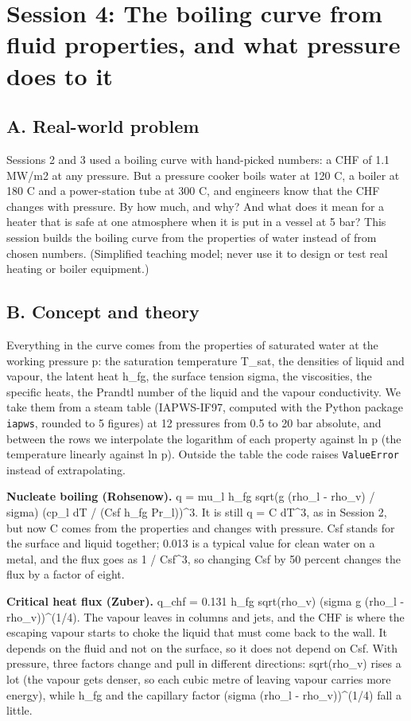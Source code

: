 \documentclass[11pt,a4paper]{article}
\begin{document}
\section{Session 4: The boiling curve from fluid properties, and what pressure does to it}

\subsection*{A. Real-world problem}
Sessions 2 and 3 used a boiling curve with hand-picked numbers: a CHF of 1.1 MW/m2 at any pressure. But a pressure cooker boils water at 120 C, a boiler at 180 C and a power-station tube at 300 C, and engineers know that the CHF changes with pressure. By how much, and why? And what does it mean for a heater that is safe at one atmosphere when it is put in a vessel at 5 bar? This session builds the boiling curve from the properties of water instead of from chosen numbers. (Simplified teaching model; never use it to design or test real heating or boiler equipment.)

\subsection*{B. Concept and theory}
Everything in the curve comes from the properties of saturated water at the working pressure p: the saturation temperature T\_sat, the densities of liquid and vapour, the latent heat h\_fg, the surface tension sigma, the viscosities, the specific heats, the Prandtl number of the liquid and the vapour conductivity. We take them from a steam table (IAPWS-IF97, computed with the Python package \texttt{iapws}, rounded to 5 figures) at 12 pressures from 0.5 to 20 bar absolute, and between the rows we interpolate the logarithm of each property against ln p (the temperature linearly against ln p). Outside the table the code raises \texttt{ValueError} instead of extrapolating.

\textbf{Nucleate boiling (Rohsenow).} q = mu\_l h\_fg sqrt(g (rho\_l - rho\_v) / sigma) (cp\_l dT / (Csf h\_fg Pr\_l))\textasciicircum{}3. It is still q = C dT\textasciicircum{}3, as in Session 2, but now C comes from the properties and changes with pressure. Csf stands for the surface and liquid together; 0.013 is a typical value for clean water on a metal, and the flux goes as 1 / Csf\textasciicircum{}3, so changing Csf by 50 percent changes the flux by a factor of eight.

\textbf{Critical heat flux (Zuber).} q\_chf = 0.131 h\_fg sqrt(rho\_v) (sigma g (rho\_l - rho\_v))\textasciicircum{}(1/4). The vapour leaves in columns and jets, and the CHF is where the escaping vapour starts to choke the liquid that must come back to the wall. It depends on the fluid and not on the surface, so it does not depend on Csf. With pressure, three factors change and pull in different directions: sqrt(rho\_v) rises a lot (the vapour gets denser, so each cubic metre of leaving vapour carries more energy), while h\_fg and the capillary factor (sigma (rho\_l - rho\_v))\textasciicircum{}(1/4) fall a little.
\end{document}
